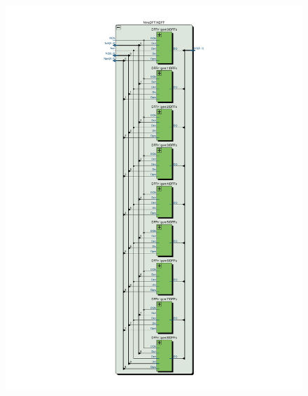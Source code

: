 \documentclass[13pt,a4paper]{report}
\begin{document}
\begin{figure}[H]
{\includegraphics[scale=0.35, clip, trim={6cm 1cm 6cm 1.4cm}]{images/Exc1_NineDFF_RTL.pdf}
}
\end{figure}
\end{document}
